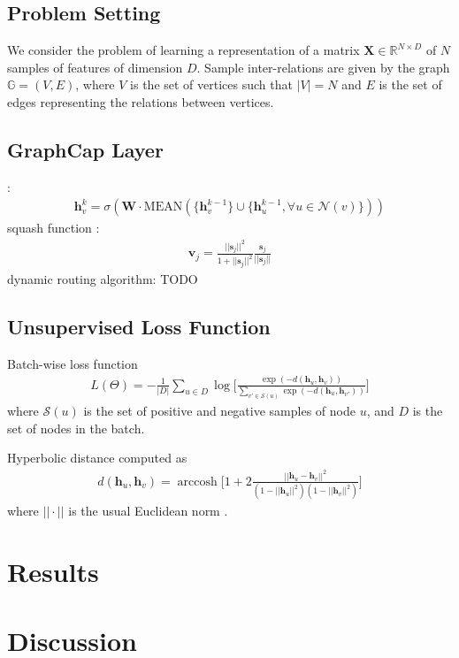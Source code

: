\documentclass{IEEEtran}
\DeclareMathOperator{\arccosh}{arccosh}
{\tiny }
\begin{document}
	\subsection{Problem Setting}
	We consider the problem of learning a representation of a matrix $\textbf{X} \in \mathbb{R}^{N\times D}$ of $N$ samples of features of dimension $D$. Sample inter-relations are given by the graph $\mathbb{G} = (V, E)$, where $V$ is the set of vertices such that $|V|=N$ and $E$ is the set of edges representing the relations between vertices. 
	
	\subsection{GraphCap Layer}
	\cite{hamilton2017inductive}:
	\begin{align*}
	\textbf{h}^k_v = \sigma(\textbf{W}\cdot \mathrm{MEAN}(\{\textbf{h}^{k-1}_v\}\cup\{\textbf{h}^{k-1}_u, \forall u\in \mathcal{N}(v)\}))
	\end{align*}
	squash function \cite{sabour2017dynamic}:
	\begin{align*}
	\textbf{v}_j = \frac{||\textbf{s}_j||^2}{1 + ||\textbf{s}_j||^2}
	\frac{\textbf{s}_j}{||\textbf{s}_j||}
	\end{align*}
	dynamic routing algorithm: \cite{sabour2017dynamic}
	TODO
	\subsection{Unsupervised Loss Function}
	Batch-wise loss function
	\begin{align*}
	L(\Theta) = -\frac{1}{|D|} \sum_{u \in D} \log \bigg[\frac{\exp(-d(\textbf{h}_u, \textbf{h}_v))}{\sum_{v' \in \mathcal{S}(u)} \exp(-d(\textbf{h}_u, \textbf{h}_{v'}))} \bigg]
	\end{align*}
	where $\mathcal{S}(u)$ is the set of positive and negative samples of node $u$, and $D$ is the set of nodes in the batch. 
	
	Hyperbolic distance computed as 
	\begin{align*}
	d(\textbf{h}_u, \textbf{h}_v) = \arccosh \bigg[1 + 2\frac{||\textbf{h}_u -\textbf{h}_v||^2}{(1 - ||\textbf{h}_u||^2)(1-||\textbf{h}_v||^2)}\bigg]
	\end{align*}
	where $||\cdot||$ is the usual Euclidean norm \cite{nickel2017poincar}.
	
	\section{Results}
	
	\section{Discussion}
	
	
	
	
	
\end{document}
